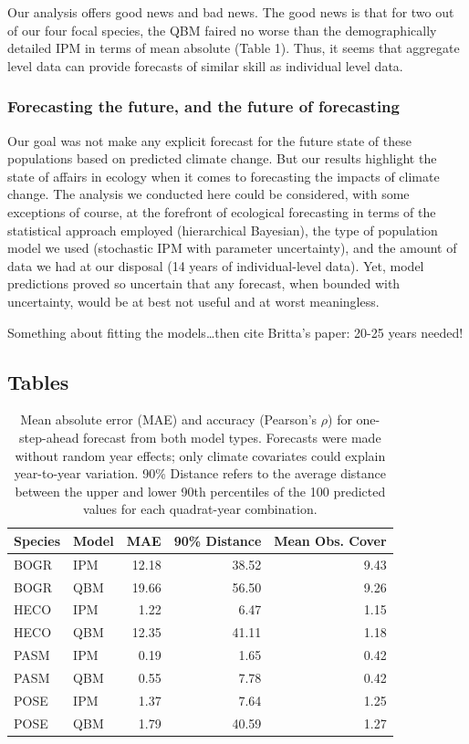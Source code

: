 \documentclass[12pt,]{article}
\begin{document}
Our analysis offers good news and bad news. The good news is that for
two out of our four focal species, the QBM faired no worse than the
demographically detailed IPM in terms of mean absolute (Table 1). Thus,
it seems that aggregate level data can provide forecasts of similar
skill as individual level data.

\subsubsection{Forecasting the future, and the future of
forecasting}\label{forecasting-the-future-and-the-future-of-forecasting}

Our goal was not make any explicit forecast for the future state of
these populations based on predicted climate change. But our results
highlight the state of affairs in ecology when it comes to forecasting
the impacts of climate change. The analysis we conducted here could be
considered, with some exceptions of course, at the forefront of
ecological forecasting in terms of the statistical approach employed
(hierarchical Bayesian), the type of population model we used
(stochastic IPM with parameter uncertainty), and the amount of data we
had at our disposal (14 years of individual-level data). Yet, model
predictions proved so uncertain that any forecast, when bounded with
uncertainty, would be at best not useful and at worst meaningless.

Something about fitting the models\ldots{}then cite Britta's paper:
20-25 years needed!

\pagebreak{}

\subsection{Tables}\label{tables}

\begin{table}[ht]
\centering
\caption{Mean absolute error (MAE) and accuracy (Pearson's $\rho$) for one-step-ahead forecast from both model types. Forecasts were made without random year effects; only climate covariates could explain year-to-year variation. 90\% Distance refers to the average distance between the upper and lower 90th percentiles of the 100 predicted values for each quadrat-year combination.} 
\begin{tabular}{llrrr}
  \hline
Species & Model & MAE & 90\% Distance & Mean Obs. Cover \\ 
  \hline
BOGR & IPM & 12.18 & 38.52 & 9.43 \\ 
  BOGR & QBM & 19.66 & 56.50 & 9.26 \\ 
  HECO & IPM & 1.22 & 6.47 & 1.15 \\ 
  HECO & QBM & 12.35 & 41.11 & 1.18 \\ 
  PASM & IPM & 0.19 & 1.65 & 0.42 \\ 
  PASM & QBM & 0.55 & 7.78 & 0.42 \\ 
  POSE & IPM & 1.37 & 7.64 & 1.25 \\ 
  POSE & QBM & 1.79 & 40.59 & 1.27 \\ 
   \hline
\end{tabular}
\end{table}
\end{document}
